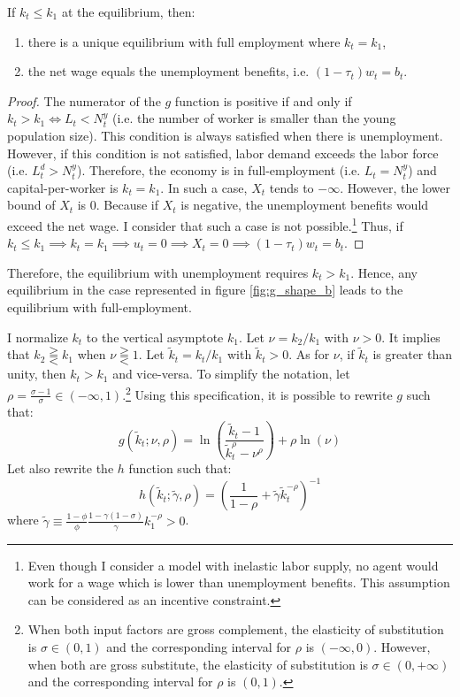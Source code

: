 	\begin{proposition}\label{prop:full_emp}
		If $k_t \leq k_1$ at the equilibrium, then:
		\begin{enumerate}[label=(\roman*)]
			\item there is a unique equilibrium with full employment where $k_t = k_1$,
			\item the net wage equals the unemployment benefits, i.e. $(1-\tau_t)w_t = b_t$.
		\end{enumerate} 
	\end{proposition}
	\begin{proof}
		The numerator of the $g$ function is positive if and only if $k_t > k_1 \Leftrightarrow L_t < N_t^y$ (i.e. the number of worker is smaller than the young population size). This condition is always satisfied when there is unemployment. However, if this condition is not satisfied, labor demand exceeds the labor force (i.e. $L_t^d > N_t^y$). Therefore, the economy is in full-employment (i.e. $L_t = N_t^y$) and capital-per-worker is $k_t = k_1$. In such a case, $X_t$ tends to  $-\infty$. However, the lower bound of $X_t$ is $0$. Because if $X_t$ is negative, the unemployment benefits would exceed the net wage. I consider that such a case is not possible.\footnote{Even though I consider a model with inelastic labor supply, no agent would work for a wage which is lower than unemployment benefits. This assumption can be considered as an incentive constraint.} Thus, if $k_t \leq k_1 \implies k_t = k_1 \implies u_t = 0 \implies X_t = 0 \implies (1-\tau_t)w_t = b_t$.
	\end{proof}

Therefore, the equilibrium with unemployment requires $k_t > k_1$. Hence, any equilibrium in the case represented in figure \ref{fig:g_shape_b} leads to the equilibrium with full-employment.

I normalize $k_t$ to the vertical asymptote $k_1$. Let $\nu = k_2/k_1$ with $\nu > 0$. It implies that $k_2 \gtreqqless k_1$ when $\nu \gtreqqless 1$. Let $\tilde{k}_t = k_t / k_1$ with $\tilde{k}_t > 0$. As for $\nu$, if $\tilde{k}_t$ is greater than unity, then $k_t>k_1$ and vice-versa. To simplify the notation, let $\rho = \frac{\sigma-1}{\sigma} \in \left(-\infty, 1\right)$.\footnote{When both input factors are gross complement, the elasticity of substitution is $\sigma \in \left(0,1\right)$ and the corresponding interval for $\rho$ is $\left(-\infty, 0\right)$. However, when both are gross substitute, the elasticity of substitution is $\sigma \in \left(0,+\infty\right)$ and the corresponding interval for $\rho$ is $\left(0,1\right)$.} Using this specification, it is possible to rewrite $g$ such that:
	\begin{equation*}
		g(\tilde{k}_t; \nu, \rho) = \ln\left(\frac{\tilde{k}_t - 1}{\tilde{k}_t^\rho - \nu^\rho}\right) + \rho\ln\left(\nu\right)
	\end{equation*}
Let also rewrite the $h$ function such that:
	\begin{equation*}
		h(\tilde{k}_t ; \tilde{\gamma}, \rho) = \left( \frac{1}{1-\rho} + \tilde{\gamma} \tilde{k}_t^{-\rho} \right)^{-1}
	\end{equation*}
where $\tilde{\gamma} \equiv \frac{1-\phi}{\phi} \frac{1-\gamma(1-\sigma)}{\gamma} k_1^{-\rho}> 0$.

